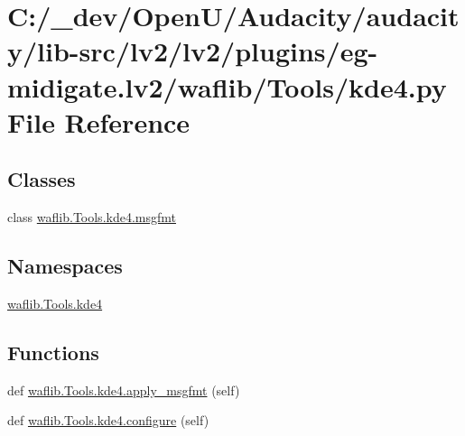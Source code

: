 \hypertarget{lv2_2plugins_2eg-midigate_8lv2_2waflib_2_tools_2kde4_8py}{}\section{C\+:/\+\_\+dev/\+Open\+U/\+Audacity/audacity/lib-\/src/lv2/lv2/plugins/eg-\/midigate.lv2/waflib/\+Tools/kde4.py File Reference}
\label{lv2_2plugins_2eg-midigate_8lv2_2waflib_2_tools_2kde4_8py}
\subsection*{Classes}
\begin{DoxyCompactItemize}
\item 
class \hyperlink{classwaflib_1_1_tools_1_1kde4_1_1msgfmt}{waflib.\+Tools.\+kde4.\+msgfmt}
\end{DoxyCompactItemize}
\subsection*{Namespaces}
\begin{DoxyCompactItemize}
\item 
 \hyperlink{namespacewaflib_1_1_tools_1_1kde4}{waflib.\+Tools.\+kde4}
\end{DoxyCompactItemize}
\subsection*{Functions}
\begin{DoxyCompactItemize}
\item 
def \hyperlink{namespacewaflib_1_1_tools_1_1kde4_a62b36b23c1da96a111189ea65c2c6baa}{waflib.\+Tools.\+kde4.\+apply\+\_\+msgfmt} (self)
\item 
def \hyperlink{namespacewaflib_1_1_tools_1_1kde4_a6ffba63774560559cef87345d1613418}{waflib.\+Tools.\+kde4.\+configure} (self)
\end{DoxyCompactItemize}
